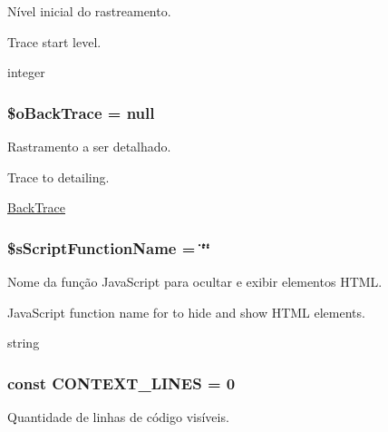 Nível inicial do rastreamento.

Trace start level.

integer \hypertarget{class_back_trace_explain_4c84cc2144d3b48bc446b407a526218b}{
\subsubsection[{\$oBackTrace}]{\setlength{\rightskip}{0pt plus 5cm}\$oBackTrace = null}}
\label{class_back_trace_explain_4c84cc2144d3b48bc446b407a526218b}


Rastramento a ser detalhado.

Trace to detailing.

\hyperlink{class_back_trace}{BackTrace} \hypertarget{class_back_trace_explain_f85538ad4277fe0063e5be10bf328bc5}{
\subsubsection[{\$sScriptFunctionName}]{\setlength{\rightskip}{0pt plus 5cm}\$sScriptFunctionName = \char`\"{}\char`\"{}}}
\label{class_back_trace_explain_f85538ad4277fe0063e5be10bf328bc5}


Nome da função JavaScript para ocultar e exibir elementos HTML.

JavaScript function name for to hide and show HTML elements.

string \hypertarget{class_back_trace_explain_c2f50be66ed7bc246f834cbdefc0c522}{
\subsubsection[{CONTEXT\_\-LINES}]{\setlength{\rightskip}{0pt plus 5cm}const {\bf CONTEXT\_\-LINES} = 0}}
\label{class_back_trace_explain_c2f50be66ed7bc246f834cbdefc0c522}


Quantidade de linhas de código visíveis.


